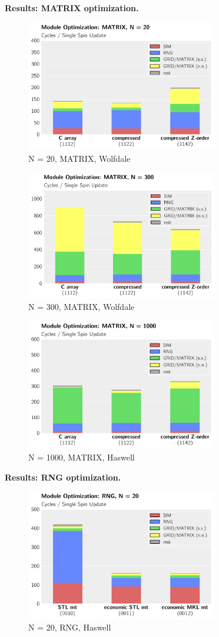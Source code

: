 \documentclass[letterpaper]{article}
\newcommand{\mypar}[1]{{\bf #1.}}
\begin{document}
\mypar{Results: MATRIX optimization}
	\begin{figure}[h]\centering
	  \includegraphics[width = 8.36cm]{plots/msk_20_3.pdf}
	  \caption{N = 20, MATRIX, Wolfdale}
	\end{figure}
	
	\begin{figure}[h]\centering
	  \includegraphics[width = 8.36cm]{plots/msk_300_3.pdf}
	  \caption{N = 300, MATRIX, Wolfdale}
	\end{figure}
	
	\begin{figure}[h]\centering
	  \includegraphics[width = 8.36cm]{plots/dg_1000_3.pdf}
	  \caption{N = 1000, MATRIX, Haswell}
	\end{figure}
\mypar{Results: RNG optimization}
	\begin{figure}[h]\centering
	  \includegraphics[width = 8.36cm]{plots/dg_20_0.pdf}
	  \caption{N = 20, RNG, Haswell}
	\end{figure}
\end{document}
